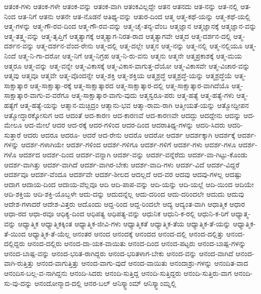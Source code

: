 {ಆತಂಕ-ಗಳು
ಆತಂಕ-ಗಳೇ
ಆತಂಕ-ವನ್ನು
ಆತಂಕ-ವಾಗಿ
ಆತಂಕವಿಲ್ಲದ್ದೇ
ಆತನ
ಆತನದು
ಆತ-ನನ್ನು
ಆತ-ನಲ್ಲಿ
ಆತ-ನಿಂದ
ಆತ-ನಿಗೆ
ಆತನು
ಆತನೇ
ಆತ-ನೊಡನೆ
ಆತಿಥ್ಯ-ವನ್ನು
ಆತುರ-ದಿಂದ
ಆತ್ಮ
ಆತ್ಮ-ಕಥೆ-ಯನ್ನು
ಆತ್ಮ-ಕಥೆ-ಯಲ್ಲಿ
ಆತ್ಮ-ಗಳನ್ನು
ಆತ್ಮ-ಗೌ-ರವ-ದಿಂದ
ಆತ್ಮ-ಗೌ-ರವ-ವನ್ನು
ಆತ್ಮ-ಚೈ-ತನ್ಯ-ವೆಂಬ
ಆತ್ಮಜ್ಞಾನ
ಆತ್ಮಜ್ಞಾನಕ್ಕೆ
ಆತ್ಮಜ್ಞಾನ-ವನ್ನು
ಆತ್ಮ-ತತ್ತ್ವ-ವನ್ನು
ಆತ್ಮ-ತೃಪ್ತಿಗೆ
ಆತ್ಮತ್ಯಾಗಕ್ಕೆ
ಆತ್ಮತ್ಯಾಗ-ನಿರತ-ರಾದ
ಆತ್ಮತ್ಯಾಗವೇ
ಆತ್ಮದ
ಆತ್ಮ-ದರ್ಶನ-ದಲ್ಲಿ
ಆತ್ಮ-ದರ್ಶನ-ವನ್ನು
ಆತ್ಮ-ದರ್ಶನ-ವೆಂದ-ರೇನು
ಆತ್ಮ-ದಲ್ಲಿ
ಆತ್ಮ-ದಲ್ಲೇ
ಆತ್ಮನ
ಆತ್ಮ-ನನ್ನು
ಆತ್ಮ-ನಲ್ಲಿ
ಆತ್ಮ-ನಲ್ಲಿಯೂ
ಆತ್ಮ-ನಿಂದೆ
ಆತ್ಮ-ನಿ-ಗಾ-ದರೋ
ಆತ್ಮ-ನಿಗೆ
ಆತ್ಮ-ನಿಗ್ರಹ
ಆತ್ಮ-ನಿ-ರು-ವನು
ಆತ್ಮನು
ಆತ್ಮನೇ
ಆತ್ಮಪ್ರಕಾಶಕ್ಕೆ
ಆತ್ಮ-ಮಯ
ಆತ್ಮರೂ
ಆತ್ಮ-ವನ್ನು
ಆತ್ಮ-ವನ್ನೇ
ಆತ್ಮ-ವಿಕಾಸಕ್ಕೆ
ಆತ್ಮ-ವಿಕಾಸ-ವಾಗುತ್ತ-ದೆಯೋ
ಆತ್ಮ-ವಿಕಾಸವೇ
ಆತ್ಮ-ವಿಚಾರ-ವನ್ನು
ಆತ್ಮವು
ಆತ್ಮವೂ
ಆತ್ಮವೇ
ಆತ್ಮ-ವೊಂದನ್ನೇ
ಆತ್ಮ-ಶಕ್ತಿ
ಆತ್ಮ-ಶಕ್ತಿಯ
ಆತ್ಮಶ್ರದ್ಧೆ
ಆತ್ಮಶ್ರದ್ಧೆ-ಯನ್ನು
ಆತ್ಮಶ್ರದ್ಧೆಯೆ
ಆತ್ಮ-ಸಾಕ್ಷಾತ್ಕಾರ
ಆತ್ಮ-ಸಾಕ್ಷಾತ್ಕಾ-ರಕ್ಕೆ
ಆತ್ಮ-ಸಾಕ್ಷಾತ್ಕಾರದ
ಆತ್ಮ-ಸಾಕ್ಷಾತ್ಕಾರ-ದಲ್ಲಿ
ಆತ್ಮ-ಸಾಕ್ಷಾತ್ಕಾರ-ವಾಗಿದೆಯೊ
ಆತ್ಮ-ಸಾಕ್ಷಾತ್ಕಾರ-ವಾಗು-ವ-ವರೆಗೂ
ಆತ್ಮ-ಸಾಕ್ಷಾತ್ಕಾರ-ವಾಗು-ವುದು
ಆತ್ಮಸ್ವರೂ-ಪರು
ಆತ್ಮ-ಹತ್ಯೆ
ಆತ್ಮ-ಹತ್ಯೆ-ಗಳು
ಆತ್ಮ-ಹತ್ಯೆಗೆ
ಆತ್ಮ-ಹತ್ಯೆ-ಯನ್ನು
ಆತ್ಮಾನ-ಮಚ್ಛಿದ್ರಂ
ಆತ್ಮಾನು-ಭವ
ಆತ್ಮಾ-ರಾಮ-ರಾಗಿ
ಆತ್ಮೀಯತೆ-ಯನ್ನು
ಆತ್ಮೋದ್ದೀಪನ
ಆತ್ಮೋದ್ಧಾರಕ್ಕೋಸುಗ
ಆದ
ಆದಂತೆ
ಆದ-ಕಾರಣ
ಆದ-ಕಾರಣವೆ
ಆದ-ಕಾರಣವೇ
ಆದದ್ದು
ಆದದ್ದೇನು
ಆದನ್ನು
ಆದ-ಮೇಲೂ
ಆದ-ಮೇಲೆ
ಆದರ
ಆದ-ರಕ್ಕೆ
ಆದರ-ಗಳಿಂದ
ಆದರ-ದಿಂದ
ಆದರಾತಿಥ್ಯ-ಗಳನ್ನು
ಆದರಿ-ಸಿದರು
ಆದರಿ-ಸುತ್ತಾರೆ
ಆದರು
ಆದರೂ
ಆದರೂ-
ಆದರೆ
ಆದ-ರೇನು
ಆದರೊ
ಆದರೋ
ಆದರ್ಶ
ಆದರ್ಶಕ್ಕಾಗಿ
ಆದರ್ಶಕ್ಕೆ
ಆದರ್ಶ-ಗಳನ್ನು
ಆದರ್ಶ-ಗಳಾಗಿಯೇ
ಆದರ್ಶ-ಗಳಿಂದ
ಆದರ್ಶ-ಗಳಿಗೂ
ಆದರ್ಶ-ಗಳಿಗೆ
ಆದರ್ಶ-ಗಳು
ಆದರ್ಶ-ಗಳೂ
ಆದರ್ಶ-ಗಳೊ
ಆದರ್ಶದ
ಆದರ್ಶ-ದಿಂದ
ಆದರ್ಶ-ವನ್ನಾಗಿ
ಆದರ್ಶ-ವನ್ನು
ಆದರ್ಶ-ವನ್ನೆರೆದು
ಆದರ್ಶ-ವಾ-ಗಿಟ್ಟು-ಕೊಂಡು
ಆದರ್ಶ-ವಾಗಿತ್ತು
ಆದರ್ಶ-ವಾಗಿದೆ
ಆದರ್ಶ-ವಾಗಿರ-ಬೇಕು
ಆದರ್ಶ-ವಾದಿ-ಗಳು
ಆದರ್ಶ-ವಿದೆ
ಆದರ್ಶ-ವಿದ್ದರೆ
ಆದರ್ಶವೂ
ಆದರ್ಶ-ವೆಂದೂ
ಆದರ್ಶವೇ
ಆದರ್ಶ-ಶೀಲದ
ಆದಲ್ಲದೆ
ಆದ-ವರ
ಆದವು
ಆದವು-ಗಳಲ್ಲ
ಆದಷ್ಟು
ಆದಾಗ
ಆದಾಯ-ದಿಂದ
ಆದಾಯ-ವೆಲ್ಲವೂ
ಆದಿ
ಆದಿ-ಪಾಪ-ವನ್ನು
ಆದಿ-ಯನ್ನು
ಆದಿ-ಯಲ್ಲೆ
ಆದಿ-ಯಿಂದ
ಆದಿಯೇ
ಆದಿ-ಶಕ್ತಿಯ
ಆದಿ-ಶಕ್ತಿ-ಯೊಬ್ಬಳೇ
ಆದು-ದನ್ನು
ಆದುದನ್ನೆಲ್ಲ
ಆದು-ದರಿಂದ
ಆದು-ದರಿಂದಲೇ
ಆದುದು
ಆದುವು
ಆದೇಶ-ಗಳಾದರೆ
ಆದೇಶ-ವಿತ್ತರು
ಆದೊಂದು
ಆದ್ದ-ರಿಂದ
ಆದ್ದ-ರಿಂದಲೇ
ಆದ್ಯ
ಆದ್ಯಂತ-ವಾಗಿ
ಆಧಾತ್ಮಿಕ
ಆಧಾರ
ಆಧಾ-ರದ
ಆಧಾ-ರವೂ
ಆಧಿಕ್ಯ-ದಿಂದ
ಆಧಿಪತ್ಯ
ಆಧಿಪತ್ಯ-ವನ್ನು
ಆಧುನಿಕ
ಆಧುನಿ-ಕ-ರಲ್ಲಿ
ಆಧುನಿ-ಕ-ರಿಗೆ
ಆಧ್ಯಾತ್ಮ-ವನ್ನು
ಆಧ್ಯಾತ್ಮಿಕ
ಆಧ್ಯಾತ್ಮಿಕಕ್ಕಿಂತ
ಆಧ್ಯಾತ್ಮಿಕ-ಜೀವಿ-ಗಳು
ಆಧ್ಯಾತ್ಮಿಕತೆ
ಆಧ್ಯಾತ್ಮಿಕ-ತೆಯ
ಆಧ್ಯಾತ್ಮಿಕ-ತೆ-ಯನ್ನು
ಆಧ್ಯಾತ್ಮಿಕ-ತೆ-ಯಿಂದ
ಆಧ್ಯಾತ್ಮಿಕ-ತೆ-ಯೆಲ್ಲ
ಆನಂತರ
ಆನಂದ
ಆನಂದಕ್ಕೆ
ಆನಂದದ
ಆನಂದ-ದಲ್ಲಿ
ಆನಂದ-ದಲ್ಲಿತ್ತು
ಆನಂದ-ದಲ್ಲಿದ್ದರು
ಆನಂದ-ದಲ್ಲಿರು
ಆನಂದ-ದಾ-ಯಕ-ವಾಯಿತು
ಆನಂದ-ದಿಂದ
ಆನಂದ-ಪಟ್ಟರು
ಆನಂದ-ಬಾಷ್ಪ-ಗಳನ್ನು
ಆನಂದ-ಬಾಷ್ಪ-ವನ್ನು
ಆನಂದ-ಭರಿತ-ರಾಗಿದ್ದರು
ಆನಂದ-ಭರಿತಳಾಗ-ಬೇಕು
ಆನಂದ-ವನ್ನು
ಆನಂದ-ವಾಗಿದೆ
ಆನಂದ-ವಾಗಿ-ರುತ್ತಿತ್ತು
ಆನಂದ-ವಾಗುತ್ತಿತ್ತು
ಆನಂದ-ವಾಗು-ವುದೆ
ಆನಂದ-ವಾಯಿತು
ಆನಂದಾಶ್ರು-ಗಳನ್ನು
ಆನಂದಿತ-ವಾದ
ಆನಂದಿಸ-ಬಲ್ಲ-ವ-ನಾಗಿದ್ದನು
ಆನಂದಿ-ಸಿದರು
ಆನಂದಿ-ಸುತ್ತಿದ್ದ
ಆನಂದಿ-ಸುತ್ತಿದ್ದರು
ಆನಂದಿ-ಸುತ್ತಿರು-ವಾಗ
ಆನಂದಿ-ಸು-ವು-ದನ್ನು
ಆನಂದೋನ್ಮಾದ-ದಲ್ಲಿ
ಆನರ-ಬಲ್
ಆನಿಸ್ಕ್ವಾಂಮ್
ಆನಿಸ್ಕ್ವಾಂಮ್ನಲ್ಲಿ
}
